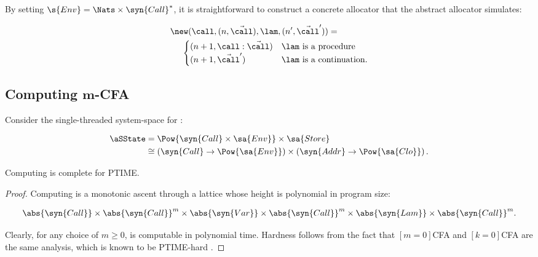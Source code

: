 By setting $\s{Env} = \Nats \times \syn{Call}^*$, it is straightforward
to construct a concrete allocator that the abstract allocator simulates:
\begin{small}\begin{align*}
  \new(\call,(n,\vec{\call}),\lam,(n',\vec{\call}')) = 
  \;\;\;\;\;\;\;\;\;\;\;\;\;
  \\
  \begin{cases}
    (n+1,\call : \vec{\call})
    & \lam \text{ is a procedure}
    \\
    (n+1,\vec{\call}')
    & \lam \text{ is a continuation}
    \text.
  \end{cases}
\end{align*}\end{small}



\subsection{Computing $\boldsymbol m$-CFA}

Consider the single-threaded system-space for \nCFA:
\begin{small}\begin{align*}
  \aSState &= \Pow{\syn{Call} \times \sa{Env}} \times \sa{Store}
  \\
  & \cong \left(\syn{Call} \to \Pow{\sa{Env}}\right)
\times \left(\syn{Addr} \to \Pow{\sa{Clo}}\right)
  \text.
\end{align*}\end{small}

\begin{theorem}
  Computing \nCFA{} is complete for PTIME.
\end{theorem}
\begin{proof}
  Computing \nCFA{} is a monotonic ascent through a lattice whose
  height is polynomial in program size:
\begin{small}\begin{align*}
  \abs{\syn{Call}} \times \abs{\syn{Call}}^m
  \times
  \abs{\syn{Var}} \times \abs{\syn{Call}}^m
  \times
  \abs{\syn{Lam}} \times \abs{\syn{Call}}^m
  \text.
\end{align*}\end{small}Clearly, for any choice of $m \geq 0$, \nCFA{} is computable in
polynomial time.
Hardness follows from the fact that $[m=0]$CFA and $[k=0]$CFA are the
same analysis, which is known to be PTIME-hard
\cite{dvanhorn:VanHorn-Mairson:ICFP07}.
\end{proof}






